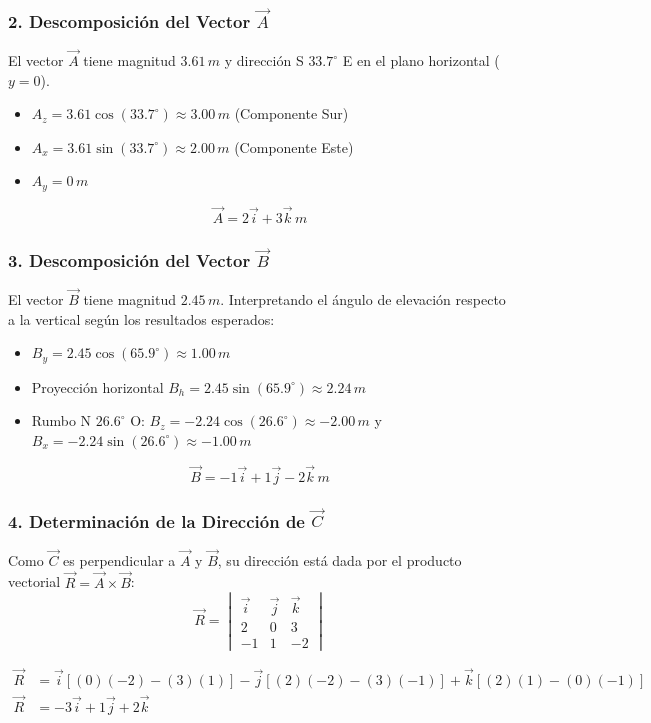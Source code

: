 \documentclass[12pt, a4paper]{article}
\begin{document}
\subsubsection*{2. Descomposición del Vector $\vec{A}$}
El vector $\vec{A}$ tiene magnitud $3.61 \, \si{m}$ y dirección S $33.7^\circ$ E en el plano horizontal ($y=0$).
\begin{itemize}
    \item $A_z = 3.61 \cos(33.7^\circ) \approx 3.00 \, \si{m}$ (Componente Sur)
    \item $A_x = 3.61 \sin(33.7^\circ) \approx 2.00 \, \si{m}$ (Componente Este)
    \item $A_y = 0 \, \si{m}$
\end{itemize}
$$\vec{A} = 2\vec{i} + 3\vec{k} \, \si{m}$$

\subsubsection*{3. Descomposición del Vector $\vec{B}$}
El vector $\vec{B}$ tiene magnitud $2.45 \, \si{m}$. Interpretando el ángulo de elevación respecto a la vertical según los resultados esperados:
\begin{itemize}
    \item $B_y = 2.45 \cos(65.9^\circ) \approx 1.00 \, \si{m}$
    \item Proyección horizontal $B_h = 2.45 \sin(65.9^\circ) \approx 2.24 \, \si{m}$
    \item Rumbo N $26.6^\circ$ O: $B_z = -2.24 \cos(26.6^\circ) \approx -2.00 \, \si{m}$ y $B_x = -2.24 \sin(26.6^\circ) \approx -1.00 \, \si{m}$
\end{itemize}
$$\vec{B} = -1\vec{i} + 1\vec{j} - 2\vec{k} \, \si{m}$$

\subsubsection*{4. Determinación de la Dirección de $\vec{C}$}
Como $\vec{C}$ es perpendicular a $\vec{A}$ y $\vec{B}$, su dirección está dada por el producto vectorial $\vec{R} = \vec{A} \times \vec{B}$:
\begin{equation*}
\vec{R} = \begin{vmatrix} 
\vec{i} & \vec{j} & \vec{k} \\ 
2 & 0 & 3 \\ 
-1 & 1 & -2 
\end{vmatrix}
\end{equation*}

\begin{align*}
    \vec{R} &= \vec{i}[(0)(-2) - (3)(1)] - \vec{j}[(2)(-2) - (3)(-1)] + \vec{k}[(2)(1) - (0)(-1)] \\
    \vec{R} &= -3\vec{i} + 1\vec{j} + 2\vec{k}
\end{align*}
\end{document}
